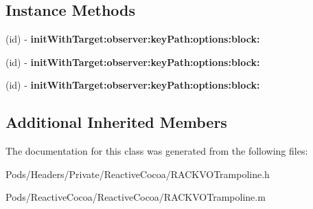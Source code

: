 \subsection*{Instance Methods}
\begin{DoxyCompactItemize}
\item 
\mbox{\label{interface_r_a_c_k_v_o_trampoline_abf1be66ec447da162b26b368ec00ba55}} 
(id) -\/ {\bfseries init\+With\+Target\+:observer\+:key\+Path\+:options\+:block\+:}
\item 
\mbox{\label{interface_r_a_c_k_v_o_trampoline_abf1be66ec447da162b26b368ec00ba55}} 
(id) -\/ {\bfseries init\+With\+Target\+:observer\+:key\+Path\+:options\+:block\+:}
\item 
\mbox{\label{interface_r_a_c_k_v_o_trampoline_abf1be66ec447da162b26b368ec00ba55}} 
(id) -\/ {\bfseries init\+With\+Target\+:observer\+:key\+Path\+:options\+:block\+:}
\end{DoxyCompactItemize}
\subsection*{Additional Inherited Members}


The documentation for this class was generated from the following files\+:\begin{DoxyCompactItemize}
\item 
Pods/\+Headers/\+Private/\+Reactive\+Cocoa/R\+A\+C\+K\+V\+O\+Trampoline.\+h\item 
Pods/\+Reactive\+Cocoa/\+Reactive\+Cocoa/R\+A\+C\+K\+V\+O\+Trampoline.\+m\end{DoxyCompactItemize}
